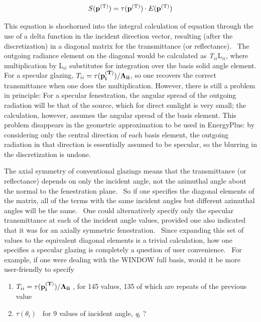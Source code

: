 \begin{equation}
S({{\bf{p}}^{{\rm{(T)}}}}) = \tau ({{\bf{p}}^{{\rm{(T)}}}}) \cdot E({{\bf{p}}^{{\rm{(T)}}}})
\end{equation}

This equation is shoehorned into the integral calculation of equation through the use of a delta function in the incident direction vector, resulting (after the discretization) in a diagonal matrix for the transmittance (or reflectance).~ The outgoing radiance element on the diagonal would be calculated as \emph{T\(_{ii}\)}L\emph{\(_{ii}\)}, where multiplication by L\emph{\(_{ii}\)} substitutes for integration over the basis solid angle element. For a specular glazing, \(T_{ii} = \tau(\bf{p}_i^{(T)})/\Lambda_{ii}\), so one recovers the correct transmittance when one does the multiplication. However, there is still a problem in principle: For a specular fenestration, the angular spread of the outgoing radiation will be that of the source, which for direct sunlight is very small; the calculation, however, assumes the angular spread of the basis element. This problem disappears in the geometric approximation to be used in EnergyPlus: by considering only the central direction of each basis element, the outgoing radiation in that direction is essentially assumed to be specular, so the blurring in the discretization is undone.

The axial symmetry of conventional glazings means that the transmittance (or reflectance) depends on only the incident angle, not the azimuthal angle about the normal to the fenestration plane.~ So if one specifies the diagonal elements of the matrix, all of the terms with the same incident angles but different azimuthal angles will be the same.~ One could alternatively specify only the specular transmittance at each of the incident angle values, provided one also indicated that it was for an axially symmetric fenestration.~ Since expanding this set of values to the equivalent diagonal elements is a trivial calculation, how one specifies a specular glazing is completely a question of user convenience.~ For example, if one were dealing with the WINDOW full basis, would it be more user-friendly to specify

\begin{enumerate}
\def\labelenumi{(\arabic{enumi})}
\item
  \(T_{ii} = \tau(\bf{p}_i^{(T)})/\Lambda_{ii}\) , for 145 values, 135 of which are repeats of the previous value
\item
  \(\tau ({\theta_i})\) ~for 9 values of incident angle, \emph{q\(_{i}\)} ?
\end{enumerate}

